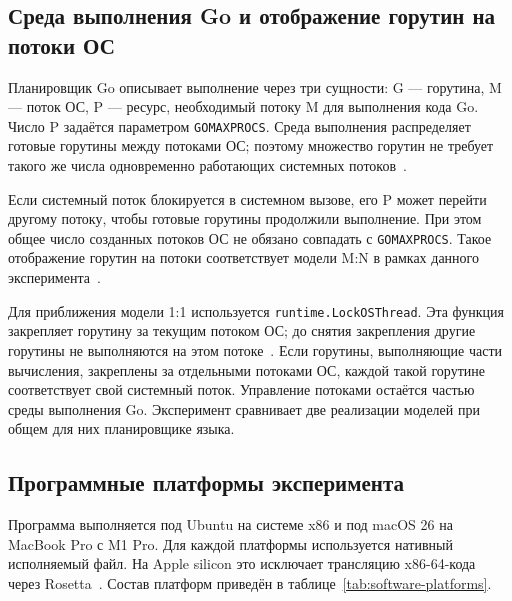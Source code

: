 
\subsection{Среда выполнения Go и отображение горутин на потоки ОС}
\label{subsec:go-runtime}

Планировщик Go описывает выполнение через три сущности: G — горутина, M — поток ОС,
  P — ресурс, необходимый потоку M для выполнения кода Go. Число P задаётся параметром
  \texttt{GOMAXPROCS}. Среда выполнения распределяет готовые горутины между потоками ОС; поэтому
  множество горутин не требует такого же числа одновременно работающих системных
  потоков~\cite{go_runtime_hacking,go_runtime_scheduler}.

Если системный поток блокируется в системном вызове, его P может перейти другому потоку, чтобы
  готовые горутины продолжили выполнение. При этом общее число созданных потоков ОС не обязано
  совпадать с \texttt{GOMAXPROCS}. Такое отображение горутин на потоки соответствует модели M:N
  в рамках данного эксперимента~\cite{go_runtime_hacking}.

Для приближения модели 1:1 используется \texttt{runtime.LockOSThread}. Эта функция закрепляет
  горутину за текущим потоком ОС; до снятия закрепления другие горутины не выполняются на этом
  потоке~\cite{go_runtime_package}. Если горутины, выполняющие части вычисления, закреплены за
  отдельными потоками ОС, каждой такой горутине соответствует свой системный поток. Управление
  потоками остаётся частью среды выполнения Go. Эксперимент сравнивает две реализации моделей при
  общем для них планировщике языка.

\subsection{Программные платформы эксперимента}
\label{subsec:software-platforms}

Программа выполняется под Ubuntu на системе x86 и под macOS 26 на MacBook Pro с M1 Pro.
  Для каждой платформы используется нативный исполняемый файл. На Apple silicon это исключает
  трансляцию x86-64-кода через Rosetta~\cite{apple_rosetta}. Состав платформ приведён в
  таблице~\ref{tab:software-platforms}.


